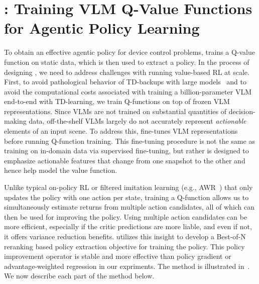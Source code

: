 \vspace{-0.1cm}
\section{\ourmethod: Training VLM Q-Value Functions for Agentic Policy Learning}
\vspace{-0.1cm}

To obtain an effective agentic policy for device control problems, \ourmethod{} trains a Q-value function on static data, which is then used to extract a policy. In the process of designing \ourmethod{}, we need to address challenges with running value-based RL at scale. First, to avoid pathological behavior of TD-backups with large models~\citep{zhou2024archertraininglanguagemodel,snell2023offlinerlnaturallanguage,abdulhai2023lmrlgymbenchmarksmultiturn,chebotar2023qtransformerscalableofflinereinforcement} and to avoid the computational costs associated with training a billion-parameter VLM end-to-end with TD-learning, we train Q-functions on top of frozen VLM representations. Since VLMs are not trained on substantial quantities of decision-making data, off-the-shelf VLMs largely do not accurately represent \emph{actionable} elements of an input scene. To address this, \ourmethod{} fine-tunes VLM representations before running Q-function training. This fine-tuning procedure is not the same as training on in-domain data via supervised fine-tuning, but rather is designed to emphasize actionable features that change from one snapshot to the other and hence help model the value function.

Unlike typical on-policy RL or filtered imitation learning (e.g., AWR~\citep{peng2019advantageweightedregressionsimplescalable}) that only updates the policy with one action per state, training a Q-function allows us to simultaneously estimate returns from multiple action candidates, all of which can then be used for improving the policy. Using multiple action candidates can be more efficient, especially if the critic predictions are more liable, and even if not, it offers variance reduction benefits. \ourmethod{} utilizes this insight to develop a Best-of-N reranking based policy extraction objective for training the policy. This policy improvement operator is stable and more effective than policy gradient or advantage-weighted regression in our expriments. The method is illustrated in~. We now describe each part of the method below.

